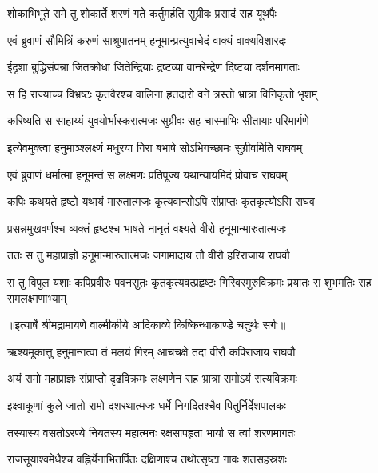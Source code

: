 \twolineshloka
{शोकाभिभूते रामे तु शोकार्ते शरणं गते}
{कर्तुमर्हति सुग्रीवः प्रसादं सह यूथपैः} %

\twolineshloka
{एवं ब्रुवाणं सौमित्रिं करुणं साश्रुपातनम्}
{हनूमान्प्रत्युवाचेदं वाक्यं वाक्यविशारदः} %

\twolineshloka
{ईदृशा बुद्धिसंपन्ना जितक्रोधा जितेन्द्रियाः}
{द्रष्टव्या वानरेन्द्रेण दिष्ट्या दर्शनमागताः} %

\twolineshloka
{स हि राज्याच्च विभ्रष्टः कृतवैरश्च वालिना}
{हृतदारो वने त्रस्तो भ्रात्रा विनिकृतो भृशम्} %

\twolineshloka
{करिष्यति स साहाय्यं युवयोर्भास्करात्मजः}
{सुग्रीवः सह चास्माभिः सीतायाः परिमार्गणे} %

\twolineshloka
{इत्येवमुक्त्वा हनुमाञ्श्लक्ष्णं मधुरया गिरा}
{बभाषे सोऽभिगच्छामः सुग्रीवमिति राघवम्} %

\twolineshloka
{एवं ब्रुवाणं धर्मात्मा हनूमन्तं स लक्ष्मणः}
{प्रतिपूज्य यथान्यायमिदं प्रोवाच राघवम्} %

\twolineshloka
{कपिः कथयते हृष्टो यथायं मारुतात्मजः}
{कृत्यवान्सोऽपि संप्राप्तः कृतकृत्योऽसि राघव} %

\twolineshloka
{प्रसन्नमुखवर्णश्च व्यक्तं हृष्टश्च भाषते}
{नानृतं वक्ष्यते वीरो हनूमान्मारुतात्मजः} %

\twolineshloka
{ततः स तु महाप्राज्ञो हनूमान्मारुतात्मजः}
{जगामादाय तौ वीरौ हरिराजाय राघवौ} %

\fourlineindentedshloka
{स तु विपुल यशाः कपिप्रवीरः}
{ पवनसुतः कृतकृत्यवत्प्रहृष्टः}
{गिरिवरमुरुविक्रमः प्रयातः}
{ स शुभमतिः सह रामलक्ष्मणाभ्याम्} %


{॥इत्यार्षे श्रीमद्रामायणे वाल्मीकीये आदिकाव्ये किष्किन्धाकाण्डे चतुर्थः सर्गः॥}


\twolineshloka
{ऋश्यमूकात्तु हनुमान्गत्वा तं मलयं गिरम्}
{आचचक्षे तदा वीरौ कपिराजाय राघवौ} %

\twolineshloka
{अयं रामो महाप्राज्ञः संप्राप्तो दृढविक्रमः}
{लक्ष्मणेन सह भ्रात्रा रामोऽयं सत्यविक्रमः} %

\twolineshloka
{इक्ष्वाकूणां कुले जातो रामो दशरथात्मजः}
{धर्मे निगदितश्चैव पितुर्निर्देशपालकः} %

\twolineshloka
{तस्यास्य वसतोऽरण्ये नियतस्य महात्मनः}
{रक्षसापहृता भार्या स त्वां शरणमागतः} %

\twolineshloka
{राजसूयाश्वमेधैश्च वह्निर्येनाभितर्पितः}
{दक्षिणाश्च तथोत्सृष्टा गावः शतसहस्रशः} %


